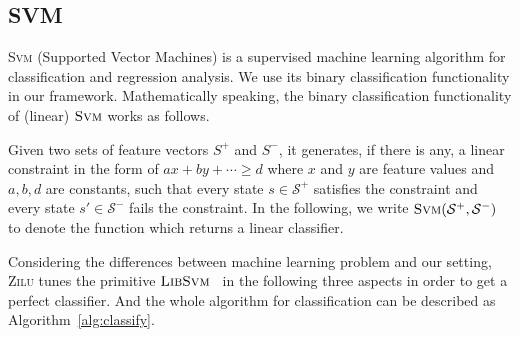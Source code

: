 \subsection{SVM}
\label{subsec:svm}
\textsc{Svm} (Supported Vector Machines) is a supervised machine learning algorithm for classification and regression analysis. 
We use its binary classification functionality in our framework. 
Mathematically speaking, the binary classification functionality of (linear) $\textsc{Svm}$ works as follows. 

Given two sets of feature vectors $S^+$ and $S^-$, it generates, if there is any, 
a linear constraint in the form of $ax + by + \cdots \geq d$ where $x$ and $y$ are feature values and $a, b, d$ are constants, 
such that every state $s \in \mathcal{S}^+$ satisfies the constraint and every state $s' \in \mathcal{S}^-$ fails the constraint. 
In the following, we write $\textsc{Svm}(\mathcal{S}^+, \mathcal{S}^-)$ to denote the function which returns a linear classifier.


Considering the differences between machine learning problem and our setting, 
\textsc{Zilu} tunes the primitive $\textsc{LibSvm}$~\cite{chang2011libsvm} in the following three aspects in order to get a perfect classifier.
And the whole algorithm for classification can be described as Algorithm~\ref{alg:classify}.

